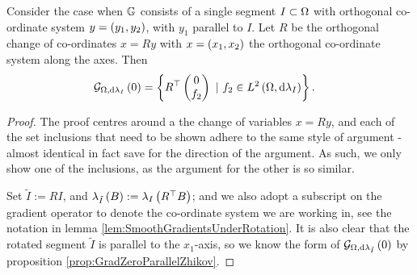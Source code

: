 \begin{prop} \label{prop:RotationOfEdgeGradients}
	Consider the case when $\mathbb{G}$ consists of a single segment $I\subset\Omega$ with orthogonal co-ordinate system $y=\left( y_1,y_2 \right)$, with $y_1$ parallel to $I$.
	Let $R$ be the orthogonal change of co-ordinates $x=Ry$ with $x=\left( x_1,x_2 \right)$ the orthogonal co-ordinate system along the axes.
	Then
	\begin{align*}
		\mathcal{G}_{ \Omega, \mathrm{d}\lambda_I}\left( 0 \right) 
		&= \left\{  R^{\top} \begin{pmatrix} 0 \\ f_2 \end{pmatrix} \ \vert \ f_2\in L^{2}\left( \Omega,\mathrm{d}\lambda_I \right)  \right\}.
	\end{align*}
\end{prop}
\begin{proof}
	The proof centres around a the change of variables $x=Ry$, and each of the set inclusions that need to be shown adhere to the same style of argument - almost identical in fact save for the direction of the argument.
	As such, we only show one of the inclusions, as the argument for the other is so similar. \newline
	
	Set $\tilde{I} := RI$, and $\lambda_{\tilde{I}}\left( B \right) := \lambda_{I}\left( R^{\top}B \right)$; and we also adopt a subscript on the gradient operator to denote the co-ordinate system we are working in, see the notation in lemma \ref{lem:SmoothGradientsUnderRotation}.
	It is also clear that the rotated segment $\tilde{I}$ is parallel to the $x_1$-axis, so we know the form of $\mathcal{G}_{ \Omega, \mathrm{d}\lambda_{\tilde{I}}}\left( 0 \right)$ by proposition \ref{prop:GradZeroParallelZhikov}. \newline
	

\end{proof}
